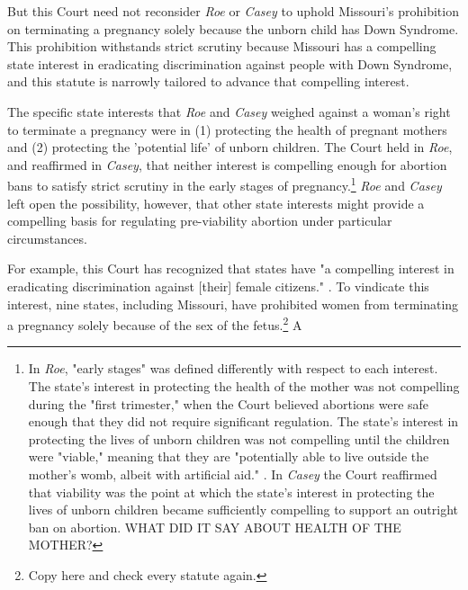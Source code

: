 \documentclass[12pt,\documentclassflag]{SCOTUS_Brief}
\begin{document}
But this Court need not reconsider \textit{Roe} or \textit{Casey} \cite[!]{Casey} to uphold Missouri's prohibition on terminating a pregnancy solely because the unborn child has Down Syndrome. This prohibition withstands strict scrutiny because Missouri has a compelling state interest in eradicating discrimination against people with Down Syndrome, and this statute is narrowly tailored to advance that compelling interest.

The specific state interests that \textit{Roe} \cite[!]{Roe} and \textit{Casey} \cite[!]{Casey} weighed against a woman's right to terminate a pregnancy were in (1) protecting the health of pregnant mothers and (2) protecting the 'potential life' of unborn children. The Court held in \textit{Roe}, and reaffirmed in \textit{Casey}, that neither interest is compelling enough for abortion bans to satisfy strict scrutiny in the early stages of pregnancy.\footnote{In \textit{Roe}, "early stages" was defined differently with respect to each interest. The state's interest in protecting the health of the mother was not compelling during the "first trimester," when the Court believed abortions were safe enough that they did not require significant regulation. The state's interest in protecting the lives of unborn children was not compelling until the children were "viable," meaning that they are "potentially able to live outside the mother's womb, albeit with artificial aid." . In \textit{Casey} \cite[i]{Casey} the Court reaffirmed that viability was the point at which the state's interest in protecting the lives of unborn children became sufficiently compelling to support an outright ban on abortion. WHAT DID IT SAY ABOUT HEALTH OF THE MOTHER? } \textit{Roe} \cite[!]{Roe} and \textit{Casey} \cite[!]{Casey} left open the possibility, however, that other state interests might provide a compelling basis for regulating pre-viability abortion under particular circumstances.

For example, this Court has recognized that states have "a compelling interest in eradicating discrimination against [their] female citizens." . To vindicate this interest, nine states, including Missouri, have prohibited women from terminating a pregnancy solely because of the sex of the fetus.\footnote{Copy here and check every statute again.} A
\end{document}
